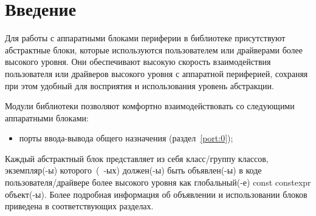 \section{Введение}
Для работы с аппаратными блоками периферии в библиотеке присутствуют абстрактные блоки, которые используются пользователем или драйверами более высокого уровня. Они обеспечивают высокую скорость взаимодействия пользователя или драйверов высокого уровня с аппаратной периферией, сохраняя при этом удобный для восприятия и использования уровень абстракции.

Модули библиотеки позволяют комфортно взаимодействовать со следующими аппаратными блоками:
\begin{itemize}
	\item порты ввода-вывода общего назначения (раздел~\ref{port:0});
\end{itemize}

Каждый абстрактный блок представляет из себя класс/группу классов, экземпляр(-ы) которого~(~-ых) должен(-ы) быть объявлен(-ы) в коде пользователя/драйвере более высокого уровня как гло\-баль\-ный(-е) const constexpr объект(-ы). Более подробная информация об объявлении и использовании блоков приведена в соответствующих разделах.